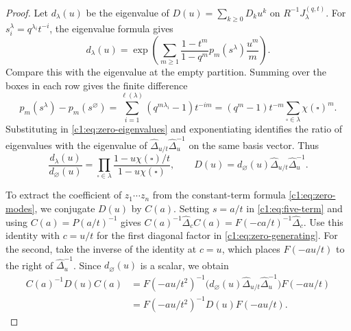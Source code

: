 \documentclass[12pt,reqno,a4paper]{amsart}
\numberwithin{equation}{section}
\numberwithin{figure}{section}
\theoremstyle{plain}
\theoremstyle{definition}
\begin{document}
\begin{proof}
Let $d_\lambda(u)$ be the eigenvalue of $D(u)=\sum_{k\geq0}D_ku^k$
on $R^{-1}J_\lambda^{(q,t)}$.  For $s_i^\lambda=q^{\lambda_i}t^{-i}$,
the eigenvalue formula \cite[equation~(3.18) and Proposition~3.17]{FHHSY}
gives
\begin{equation}\label{c1:eq:zero-eigenvalues}
 d_\lambda(u)=\exp\left(\sum_{m\geq1}
         \frac{1-t^m}{1-q^m}p_m(s^\lambda)\frac{u^m}{m}\right).
\end{equation}
Compare this with the eigenvalue at the empty partition.  Summing
over the boxes in each row gives the finite difference
\[
 p_m(s^\lambda)-p_m(s^\varnothing)
 =\sum_{i=1}^{\ell(\lambda)}(q^{m\lambda_i}-1)t^{-im}
 =(q^m-1)t^{-m}\sum_{\square\in\lambda}\chi(\square)^m.
\]
Substituting in \eqref{c1:eq:zero-eigenvalues} and exponentiating
identifies the ratio of eigenvalues with the eigenvalue of
$\widehat\Delta_{u/t}\widehat\Delta_u^{-1}$ on the same basis vector.
Thus
\begin{equation}\label{c1:eq:zero-generating}
 \frac{d_\lambda(u)}{d_\varnothing(u)}
 =\prod_{\square\in\lambda}\frac{1-u\chi(\square)/t}{1-u\chi(\square)},
 \qquad
 D(u)=d_\varnothing(u)\widehat\Delta_{u/t}\widehat\Delta_u^{-1}.
\end{equation}

To extract the coefficient of $z_1\cdots z_n$ from the constant-term
formula \eqref{c1:eq:zero-modes}, we conjugate $D(u)$ by $C(a)$.
Setting $s=a/t$ in \eqref{c1:eq:five-term} and using $C(a)=P(a/t)^{-1}$ gives
$C(a)^{-1}\widehat\Delta_c C(a)=F(-ca/t)^{-1}\widehat\Delta_c$.
Use this identity with $c=u/t$ for the first diagonal factor in
\eqref{c1:eq:zero-generating}.  For the second, take the inverse of
the identity at $c=u$, which places $F(-au/t)$ to the right of
$\widehat\Delta_u^{-1}$.  Since $d_\varnothing(u)$ is a scalar, we obtain
\begin{equation}\label{c1:eq:translated-zero-modes}
 \begin{aligned}
 C(a)^{-1}D(u)C(a)
 &=F(-au/t^2)^{-1}
   \bigl(d_\varnothing(u)\widehat\Delta_{u/t}\widehat\Delta_u^{-1}\bigr)F(-au/t)\\
 &=F(-au/t^2)^{-1}D(u)F(-au/t).
 \end{aligned}
\end{equation}


\end{proof}
\end{document}
